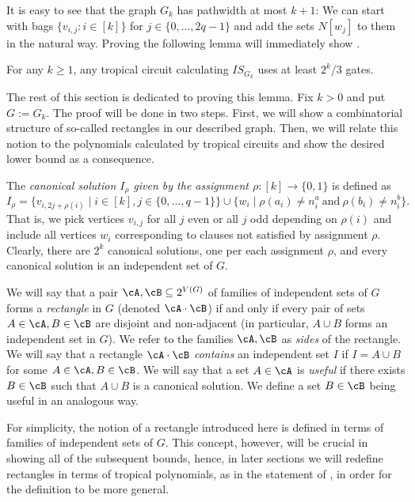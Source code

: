 It is easy to see that the graph $G_k$ has pathwidth at most $k + 1$: We can start with bags $\{v_{i,j}:i \in [k]\}$ for $j \in \{0,\ldots,2q-1\}$ and add the sets $N[w_j]$ to them in the natural way. Proving the following lemma will immediately show .

\begin{lemma}\label{lem:mwis}
	For any $k \geq 1$, any tropical circuit calculating $IS_{G_k}$ uses at least $2^k / 3$ gates.
\end{lemma}

The rest of this section is dedicated to proving this lemma. Fix $k > 0$ and put $G := G_k$.
The proof will be done in two steps. First, we will show a combinatorial structure of so-called rectangles in our described graph. Then, we will relate this notion to the polynomials calculated by tropical circuits and show the desired lower bound as a consequence.

The \emph{canonical solution $I_\rho$ given by the assignment $\rho : [k] \to \{0, 1\}$} is defined as
\begin{equation*}
	I_\rho = \{ v_{i, 2j + \rho(i)} \mid i \in [k], j \in \{0, \dots, q-1\} \} \cup
	         \{ w_i \mid \rho(a_i) \neq n^a_i \ \text{and}\ \rho(b_i) \neq n^b_i \}.
\end{equation*}
That is, we pick vertices $v_{i,j}$ for all $j$ even or all $j$ odd depending on $\rho(i)$ and include all vertices $w_i$ corresponding to clauses not satisfied by assignment $\rho$. Clearly, there are $2^k$ canonical solutions, one per each assignment $\rho$, and every canonical solution is an independent set of $G$.

We will say that a pair $\cA, \cB \subseteq 2^{V(G)}$ of families of independent sets of $G$ forms a \emph{rectangle} in $G$ (denoted $\cA \cdot \cB$) if and only if every pair of sets $A \in \cA, B \in \cB$ are disjoint and non-adjacent (in particular, $A \cup B$ forms an independent set in $G$). We refer to the families $\cA, \cB$ as \emph{sides} of the rectangle. We will say that a rectangle $\cA \cdot \cB$ \emph{contains} an independent set $I$ if $I = A \cup B$ for some $A \in \cA, B \in \cB$. We will say that a set $A \in \cA$ is \emph{useful} if there exists $B \in \cB$ such that $A \cup B$ is a canonical solution. We define a set $B \in \cB$ being useful in an analogous way.

For simplicity, the notion of a rectangle introduced here is defined in terms of families of independent sets of $G$. This concept, however, will be crucial in showing all of the subsequent bounds, hence, in later sections we will redefine rectangles in terms of tropical polynomials, as in the statement of , in order for the definition to be more general.


